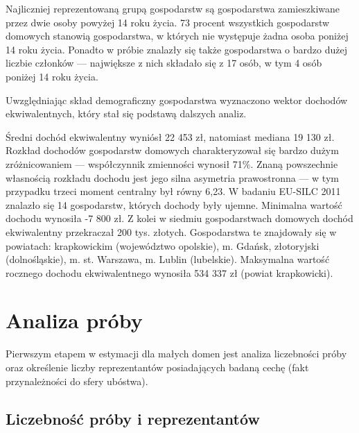 Najliczniej reprezentowaną grupą gospodarstw są gospodarstwa zamieszkiwane przez dwie osoby powyżej 14 roku życia. 73 procent wszystkich gospodarstw domowych stanowią gospodarstwa, w których nie występuje żadna osoba poniżej 14 roku życia. Ponadto w próbie znalazły się także gospodarstwa o bardzo dużej liczbie członków --- największe z nich składało się z 17 osób, w tym 4 osób poniżej 14 roku życia.

Uwzględniając skład demograficzny gospodarstwa wyznaczono wektor dochodów ekwiwalentnych, który stał się podstawą dalszych analiz. 



Średni dochód ekwiwalentny wyniósł 22 453 zł, natomiast mediana 19 130 zł. Rozkład dochodów gospodarstw domowych charakteryzował się bardzo dużym zróżnicowaniem --- współczynnik zmienności wynosił 71\%. Znaną powszechnie własnością rozkładu dochodu jest jego silna asymetria prawostronna --- w tym przypadku trzeci moment centralny był równy 6,23. W badaniu EU-SILC 2011 znalazło się 14 gospodarstw, których dochody były ujemne. Minimalna wartość dochodu wynosiła -7 800 zł. Z kolei w siedmiu gospodarstwach domowych dochód ekwiwalentny przekraczał 200 tys. złotych. Gospodarstwa te znajdowały się w powiatach: krapkowickim (województwo opolskie), m. Gdańsk, złotoryjski (dolnośląskie), m. st. Warszawa, m. Lublin (lubelskie). Maksymalna wartość rocznego dochodu ekwiwalentnego wynosiła 534 337 zł (powiat krapkowicki).

\section{Analiza próby}

Pierwszym etapem w estymacji dla małych domen jest analiza liczebności próby oraz określenie liczby reprezentantów posiadających badaną cechę (fakt przynależności do sfery ubóstwa).

\subsection{Liczebność próby i reprezentantów}


